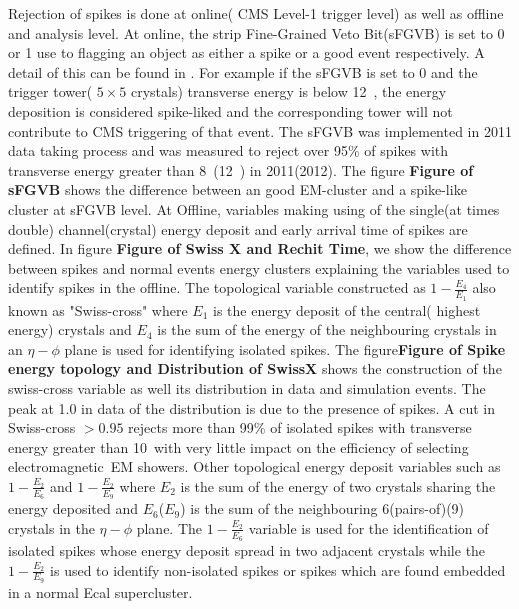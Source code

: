 \newline
Rejection of spikes is done at online( CMS Level-1 trigger level) as well as offline and analysis level.
\newline
At online, the strip Fine-Grained Veto Bit(sFGVB) is set to 0 or 1 use to flagging an object as either a spike or a good event respectively. A detail of this can be found in \cite{spike2}. For example if the sFGVB is set to 0 and the  trigger tower( $5 \times 5$ crystals) transverse energy is below 12~\GeV, the energy deposition is considered spike-liked and the corresponding tower will not contribute  to CMS triggering of that event. The sFGVB was implemented in 2011 data taking process and was measured to reject over 95\% of spikes with transverse energy greater than 8~\GeV(12~\GeV) in 2011(2012).
The figure {\textbf{Figure of sFGVB}} shows the difference between an good EM-cluster and a spike-like cluster at sFGVB level.
\newline
At Offline, variables making using of the single(at times double) channel(crystal) energy deposit and early arrival time of spikes are defined.
In figure {\textbf{Figure of Swiss X and Rechit Time}}, we show the difference between spikes and normal events energy clusters explaining the variables used to identify spikes in the offline.
The topological variable constructed as $1 - \frac{E_{4}}{E_{1}}$ also known as "Swiss-cross" where $E_{1}$ is the energy deposit of the central( highest energy) crystals and $E_{4}$ is the sum of the energy of the neighbouring crystals in an $\eta - \phi $ plane is used for identifying isolated spikes.
The figure{\textbf{Figure of Spike energy topology and Distribution of SwissX}} shows the construction of the swiss-cross variable as well its distribution in data and simulation events. The peak at 1.0 in data of the distribution is due to the presence of spikes. A cut in Swiss-cross $ > 0.95$ rejects more than 99\% of isolated spikes with transverse energy greater than 10~\GeV with very little impact on the efficiency of selecting electromagnetic~{EM} showers.
Other topological energy deposit variables such as $ 1 - \frac{E_{2}}{E_{6}}$ and $ 1 - \frac{E_{2}}{E_{9}} $ where $E_{2}$ is the sum of the energy of two  crystals sharing the energy deposited and $E_{6}$($E_{9}$) is the sum of the neighbouring 6(pairs-of)(9) crystals in the $\eta - \phi$ plane.
The $ 1 - \frac{E_{2}}{E_{6}} $ variable is used for the identification of  isolated spikes whose energy deposit spread in two adjacent crystals while the  $ 1 - \frac{E_{2}}{E_{9}} $ is used to identify  non-isolated spikes or spikes which are found embedded in a normal Ecal supercluster.

